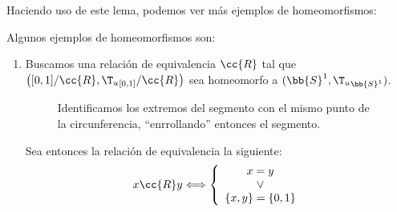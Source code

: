 Haciendo uso de este lema, podemos ver más ejemplos de homeomorfismos:
\begin{ejemplo}
    Algunos ejemplos de homeomorfismos son:
    \begin{enumerate}
        \item Buscamos una relación de equivalencia $\cc{R}$ tal que $\left([0,1]/\cc{R},{\T_u}_{[0,1]}/\cc{R}\right)$ sea homeomorfo a $(\bb{S}^1,{\T_u}_{\bb{S}^1})$.
        \begin{figure}[H]
            \centering
            \hfill\begin{subfigure}[c]{0.42\linewidth}
                \centering
            \end{subfigure}
            \begin{subfigure}[c]{0.42\linewidth}
                \centering
            \end{subfigure}
            \caption{\centering Identificamos los extremos del segmento con el mismo punto de la circunferencia, ``enrrollando'' entonces el segmento.}
        \end{figure}
        
        
        Sea entonces la relación de equivalencia la siguiente:
        \begin{equation*}
            x\cc{R}y \Longleftrightarrow \left\{\begin{array}{c}
                x=y \\ \lor \\
                \{x,y\} = \{0,1\}
            \end{array}\right.
        \end{equation*}


\end{enumerate}
\end{ejemplo}
